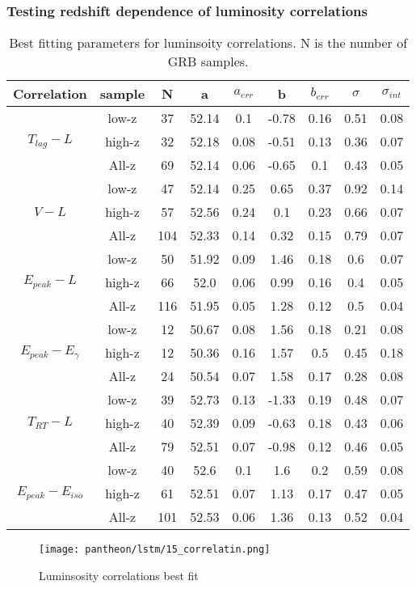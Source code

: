 \subsubsection{Testing redshift dependence of luminosity correlations}
\begin{table}[H]
\centering
\begin{tabular}{|c|c|c|c|c|c|c|c|c|}
\hline
Correlation & sample & N & a & $a_{err}$ & b & $b_{err}$ & $\sigma$ & $\sigma_{int}$\\
\hline
\multirow{3}{*}{$T_{lag}-L$} & low-z & 37 & 52.14 & 0.1 & -0.78 & 0.16 & 0.51 & 0.08\\
\cline{2-9}
 & high-z & 32 & 52.18 & 0.08 & -0.51 & 0.13 & 0.36 & 0.07\\
\cline{2-9}
 & All-z & 69 & 52.14 & 0.06 & -0.65 & 0.1 & 0.43 & 0.05\\
\hline
\multirow{3}{*}{$V-L$} & low-z & 47 & 52.14 & 0.25 & 0.65 & 0.37 & 0.92 & 0.14\\
\cline{2-9}
 & high-z & 57 & 52.56 & 0.24 & 0.1 & 0.23 & 0.66 & 0.07\\
\cline{2-9}
 & All-z & 104 & 52.33 & 0.14 & 0.32 & 0.15 & 0.79 & 0.07\\
\hline
\multirow{3}{*}{$E_{peak}-L$} & low-z & 50 & 51.92 & 0.09 & 1.46 & 0.18 & 0.6 & 0.07\\
\cline{2-9}
 & high-z & 66 & 52.0 & 0.06 & 0.99 & 0.16 & 0.4 & 0.05\\
\cline{2-9}
 & All-z & 116 & 51.95 & 0.05 & 1.28 & 0.12 & 0.5 & 0.04\\
\hline
\multirow{3}{*}{$E_{peak}-E_{\gamma}$} & low-z & 12 & 50.67 & 0.08 & 1.56 & 0.18 & 0.21 & 0.08\\
\cline{2-9}
 & high-z & 12 & 50.36 & 0.16 & 1.57 & 0.5 & 0.45 & 0.18\\
\cline{2-9}
 & All-z & 24 & 50.54 & 0.07 & 1.58 & 0.17 & 0.28 & 0.08\\
\hline
\multirow{3}{*}{$T_{RT}-L$} & low-z & 39 & 52.73 & 0.13 & -1.33 & 0.19 & 0.48 & 0.07\\
\cline{2-9}
 & high-z & 40 & 52.39 & 0.09 & -0.63 & 0.18 & 0.43 & 0.06\\
\cline{2-9}
 & All-z & 79 & 52.51 & 0.07 & -0.98 & 0.12 & 0.46 & 0.05\\
\hline
\multirow{3}{*}{$E_{peak}-E_{iso}$} & low-z & 40 & 52.6 & 0.1 & 1.6 & 0.2 & 0.59 & 0.08\\
\cline{2-9}
 & high-z & 61 & 52.51 & 0.07 & 1.13 & 0.17 & 0.47 & 0.05\\
\cline{2-9}
 & All-z & 101 & 52.53 & 0.06 & 1.36 & 0.13 & 0.52 & 0.04\\
\hline
\end{tabular}
\caption{Best fitting parameters for luminsoity correlations. N is the number of GRB samples.}
\label{table_union_lstm}
\end{table}
\begin{figure}[H]
	\centering
	\texttt{[image: pantheon/lstm/15\_correlatin.png]}
	\caption{Luminsosity correlations best fit}
	\label{fig:correlation_lstm_union}
\end{figure}
